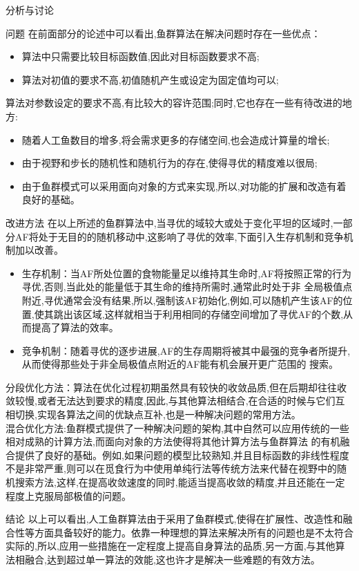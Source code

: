\documentclass[UTF8]{ctexart}
\begin{document}
\begin{section}{分析与讨论}
\begin{subsection}{问题}
在前面部分的论述中可以看出,鱼群算法在解决问题时存在一些优点：\\
\begin{itemize}
\item 算法中只需要比较目标函数值,因此对目标函数要求不高;
\item 算法对初值的要求不高,初值随机产生或设定为固定值均可以;
\end{itemize}
\indent 算法对参数设定的要求不高,有比较大的容许范围;同时,它也存在一些有待改进的地方:
\begin{itemize}
\item 随着人工鱼数目的增多,将会需求更多的存储空间,也会造成计算量的增长;
\item 由于视野和步长的随机性和随机行为的存在,使得寻优的精度难以很局;
\item 由于鱼群模式可以采用面向对象的方式来实现,所以,对功能的扩展和改造有着良好的基础。
\end{itemize}
\end{subsection}
\begin{subsection}{改进方法}
在以上所述的鱼群算法中,当寻优的域较大或处于变化平坦的区域时,一部分AF将处于无目的的随机移动中,这影响了寻优的效率,下面引入生存机制和竞争机制加以改善。
\begin{itemize}
	\item{生存机制：当AF所处位置的食物能量足以维持其生命时,AF将按照正常的行为寻优,否则,当此处的能量低于其生命的维持所需时,通常此时处于非
全局极值点附近,寻优通常会没有结果,所以,强制该AF初始化,例如,可以随机产生该AF的位置,使其跳出该区域,这样就相当于利用相同的存储空间增加了寻优AF的个数,从而提高了算法的效率。}
	\item{竞争机制：随着寻优的逐步进展,AF的生存周期将被其中最强的竞争者所提升,从而使得那些处于非全局极值点附近的AF能有机会展开更广范围的
搜索。}
\end{itemize}
\hspace{2em} 分段优化方法：算法在优化过程初期虽然具有较快的收敛品质,但在后期却往往收敛较慢,或者无法达到要求的精度,因此,与其他算法相结合,在合适的时候与它们互相切换,实现各算法之间的优缺点互补,也是一种解决问题的常用方法。\\
\indent 混合优化方法:鱼群模式提供了一种解决问题的架构,其中自然可以应用传统的一些相对成熟的计算方法,而面向对象的方法使得将其他计算方法与鱼群算法
的有机融合提供了良好的基础。例如,如果问题的模型比较熟知,并且目标函数的非线性程度不是非常严重,则可以在觅食行为中使用单纯行法等传统方法来代替在视野中的随机搜索方法,这样,在提高收敛速度的同时,能适当提高收敛的精度,并且还能在一定程度上克服局部极值的问题。
\end{subsection}
\begin{subsection}{结论}
以上可以看出,人工鱼群算法由于采用了鱼群模式,使得在扩展性、改造性和融合性等方面具备较好的能力。依靠一种理想的算法来解决所有的问题也是不太符合实际的,所以,应用一些措施在一定程度上提高自身算法的品质,另一方面,与其他算法相融合,达到超过单一算法的效能,这也许才是解决一些难题的有效方法。
\end{subsection}
\end{section}
\end{document}
